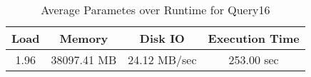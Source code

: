 \documentclass[../../main.tex]{subfiles}
\begin{document}
    \begin{table}
        \begin{center}
            \begin{tabular}{ |c|c|c|c| } 
            \hline
            Load & Memory & Disk IO & Execution Time\\
            \hline
            1.96 & 38097.41 MB & 24.12 MB/sec & 253.00 sec \\
            \hline
            \end{tabular}
            \\[1pt]
            \caption{Average Parametes over Runtime for Query16}
        \end{center}
    \end{table}
    \pagebreak
\end{document}
